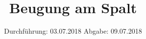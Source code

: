 
\setlength{\parindent}{0 pt}

\subject{V406}
\title{Beugung am Spalt}
\date{%
  Durchführung: 03.07.2018
  \hspace{3em}
  Abgabe: 09.07.2018
}



\maketitle
\thispagestyle{empty}
\tableofcontents
\newpage






\printbibliography{}



